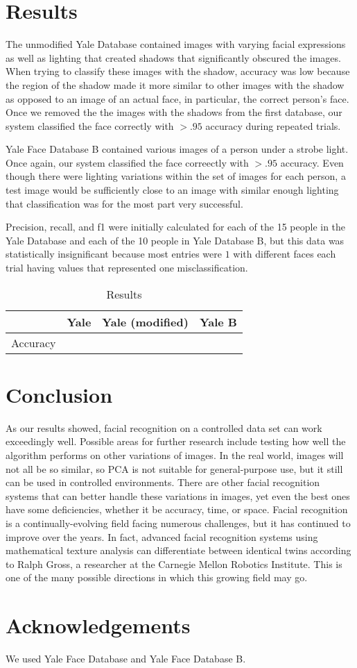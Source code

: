 \documentclass[letterpaper]{article}
\begin{document}
\section{Results}
The unmodified Yale Database contained images with varying facial expressions as well as lighting that created shadows that significantly obscured the images.  When trying to classify these images with the shadow, accuracy was low because the region of the shadow made it more similar to other images with the shadow as opposed to an image of an actual face, in particular, the correct person's face. Once we removed the the images with the shadows from the first database, our system classified the face correctly with $>.95$ accuracy during repeated trials.

Yale Face Database B contained various images of a person under a strobe light.  Once again, our system classified the face correectly with $>.95$ accuracy.  Even though there were lighting variations within the set of images for each person, a test image would be sufficiently close to an image with similar enough lighting that classification was for the most part very successful. 

Precision, recall, and f1 were initially calculated for each of the 15 people in the Yale Database and each of the 10 people in Yale Database B, but this data was statistically insignificant because most entries were $1$ with different faces each trial having values that represented one misclassification. 

\begin{table}
\begin{center}
\caption{Results}
\begin {tabular} {|c|c|c|c|}
\hline
& \textrm{Yale} & \textrm{Yale (modified)} & \textrm{Yale B}\\
\hline
Accuracy &  &  &  \\
\hline
\end {tabular}
\end{center}
\end{table}
\section{Conclusion}
As our results showed, facial recognition on a controlled data set can work exceedingly well. Possible areas for further research include testing how well the algorithm performs on other variations of images.  In the real world, images will not all be so similar, so PCA is not suitable for general-purpose use, but it still can be used in controlled environments.  There are other facial recognition systems that can better handle these variations in images, yet even the best ones have some deficiencies, whether it be accuracy, time, or space.  Facial recognition is a continually-evolving field facing numerous challenges, but it has continued to improve over the years.  In fact, advanced facial recognition systems using mathematical texture analysis can differentiate between identical twins according to Ralph Gross, a researcher at the Carnegie Mellon Robotics Institute. This is one of the many possible directions in which this growing field may go.
\section{Acknowledgements}
We used Yale Face Database and Yale Face Database B.


\end{document}
